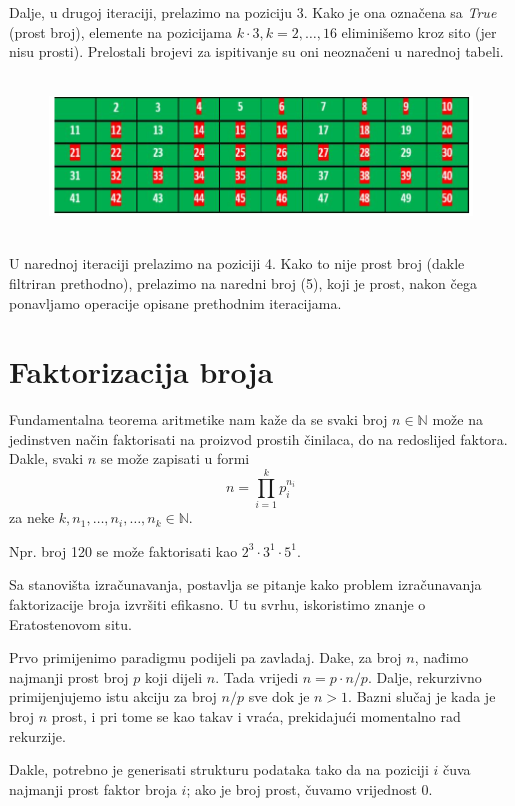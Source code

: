 Dalje, u drugoj iteraciji, prelazimo na poziciju 3. Kako je ona označena sa \emph{True} (prost broj), elemente na pozicijama $k\cdot 3, k=2, \ldots, 16$ eliminišemo kroz sito (jer nisu prosti). Prelostali brojevi za ispitivanje su oni neoznačeni u narednoj tabeli. 

\begin{figure}[H]
	\centering
	\includegraphics[width=340pt,height=120pt]{slike/sieve-it-1.png}
\end{figure}

U narednoj iteraciji prelazimo na poziciji 4. Kako to nije prost broj (dakle filtriran prethodno), prelazimo na naredni broj (5), koji je prost, nakon čega ponavljamo operacije opisane prethodnim iteracijama. 

\section{Faktorizacija broja}

Fundamentalna teorema aritmetike nam kaže da se svaki broj $n \in \mathbb{N}$ može na jedinstven način faktorisati na proizvod prostih činilaca, do na redoslijed faktora. Dakle, svaki $n$ se može zapisati u formi
 $$n = \prod_{i=1}^k p_i^{n_i}$$
 za neke $k, n_1,\ldots, n_i, \ldots, n_k \in \mathbb{N}$.
 
 Npr. broj 120 se može faktorisati kao $2^3 \cdot 3^1 \cdot 5^1$.
 
 Sa stanovišta izračunavanja, postavlja se pitanje kako problem izračunavanja faktorizacije broja izvršiti efikasno.  U tu svrhu, iskoristimo znanje o Eratostenovom situ. 
 
 Prvo primijenimo paradigmu podijeli pa zavladaj. Dake, za broj $n$, nađimo najmanji prost broj $p$ koji dijeli $n$. Tada vrijedi $n = p \cdot n/p$. Dalje, rekurzivno primijenjujemo istu akciju za broj $n/p$ sve dok je $n>1$. Bazni slučaj je kada je broj $n$ prost, i pri tome se kao takav i vraća, prekidajući momentalno rad rekurzije. 
 
 Dakle, potrebno je generisati strukturu podataka  tako da na poziciji $i$ čuva najmanji prost faktor broja $i$; ako je broj prost, čuvamo vrijednost 0.
 
